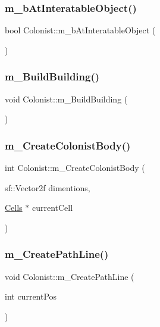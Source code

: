 \subsubsection{\texorpdfstring{m\+\_\+b\+At\+Interatable\+Object()}{m\_bAtInteratableObject()}}
{\footnotesize\ttfamily bool Colonist\+::m\+\_\+b\+At\+Interatable\+Object (\begin{DoxyParamCaption}{ }\end{DoxyParamCaption})}

\mbox{\label{class_colonist_ade6be47cebcac982789ba93d4bed5064}} 
\subsubsection{\texorpdfstring{m\+\_\+\+Build\+Building()}{m\_BuildBuilding()}}
{\footnotesize\ttfamily void Colonist\+::m\+\_\+\+Build\+Building (\begin{DoxyParamCaption}{ }\end{DoxyParamCaption})}

\mbox{\label{class_colonist_ae6111498494883c9509dc9f49cd2fa63}} 
\subsubsection{\texorpdfstring{m\+\_\+\+Create\+Colonist\+Body()}{m\_CreateColonistBody()}}
{\footnotesize\ttfamily int Colonist\+::m\+\_\+\+Create\+Colonist\+Body (\begin{DoxyParamCaption}\item[{sf\+::\+Vector2f}]{dimentions,  }\item[{\mbox{\hyperlink{class_cells}{Cells}} $\ast$}]{current\+Cell }\end{DoxyParamCaption})}

\mbox{\label{class_colonist_a4d5b1c31fff5922f67c8de7f5031fc5d}} 
\subsubsection{\texorpdfstring{m\+\_\+\+Create\+Path\+Line()}{m\_CreatePathLine()}}
{\footnotesize\ttfamily void Colonist\+::m\+\_\+\+Create\+Path\+Line (\begin{DoxyParamCaption}\item[{int}]{current\+Pos }\end{DoxyParamCaption})}

